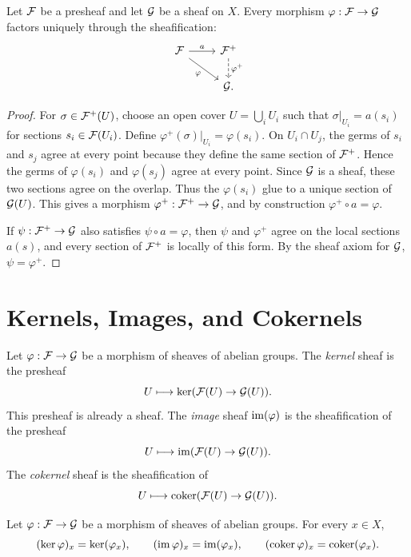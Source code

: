 \begin{proposition}
Let \(\mathcal{F}\) be a presheaf and let \(\mathcal{G}\) be a sheaf on \(X\).  Every morphism
\(\varphi:\mathcal{F}\to\mathcal{G}\) factors uniquely through the sheafification:
\[
\begin{tikzcd}
\FF \arrow[r,"a"] \arrow[dr,"\varphi"'] & \FF^+ \arrow[d,dashed,"\varphi^+"]\\
& \GG .
\end{tikzcd}
\]
\end{proposition}

\begin{proof}
For \(\sigma\in\mathcal{F}^+(U)\), choose an open cover \(U=\bigcup_i U_i\) such that
\(\sigma|_{U_i}=a(s_i)\) for sections \(s_i\in\mathcal{F}(U_i)\).  Define
\(\varphi^+(\sigma)|_{U_i}=\varphi(s_i)\).  On \(U_i\cap U_j\), the germs of
\(s_i\) and \(s_j\) agree at every point because they define the same section
of \(\mathcal{F}^+\).  Hence the germs of \(\varphi(s_i)\) and \(\varphi(s_j)\) agree
at every point.  Since \(\mathcal{G}\) is a sheaf, these two sections agree on the
overlap.  Thus the \(\varphi(s_i)\) glue to a unique section of \(\mathcal{G}(U)\).
This gives a morphism \(\varphi^+:\mathcal{F}^+\to\mathcal{G}\), and by construction
\(\varphi^+\circ a=\varphi\).

If \(\psi:\mathcal{F}^+\to\mathcal{G}\) also satisfies \(\psi\circ a=\varphi\), then
\(\psi\) and \(\varphi^+\) agree on the local sections \(a(s)\), and every
section of \(\mathcal{F}^+\) is locally of this form.  By the sheaf axiom for \(\mathcal{G}\),
\(\psi=\varphi^+\).
\end{proof}

\section{Kernels, Images, and Cokernels}

\begin{definition}
Let \(\varphi:\mathcal{F}\to\mathcal{G}\) be a morphism of sheaves of abelian groups.
The \emph{kernel} sheaf is the presheaf
\[
    U\longmapsto \ker(\mathcal{F}(U)\to\mathcal{G}(U)).
\]
This presheaf is already a sheaf.  The \emph{image} sheaf
\(\operatorname{im}(\varphi)\) is the sheafification of the presheaf
\[
    U\longmapsto \operatorname{im}(\mathcal{F}(U)\to\mathcal{G}(U)).
\]
The \emph{cokernel} sheaf is the sheafification of
\[
    U\longmapsto \operatorname{coker}(\mathcal{F}(U)\to\mathcal{G}(U)).
\]
\end{definition}

\begin{proposition}
Let \(\varphi:\mathcal{F}\to\mathcal{G}\) be a morphism of sheaves of abelian groups.  For every
\(x\in X\),
\[
    (\ker\varphi)_x=\ker(\varphi_x),\qquad
    (\operatorname{im}\varphi)_x=\operatorname{im}(\varphi_x),\qquad
    (\operatorname{coker}\varphi)_x=\operatorname{coker}(\varphi_x).
\]
\end{proposition}

